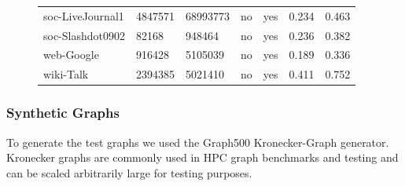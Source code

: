 \begin{figure}
{\begin{tabular}{ *7l }
soc-LiveJournal1 & 4847571 & 68993773 & no & yes &0.234& 0.463\\
soc-Slashdot0902 & 82168 & 948464 & no & yes &0.236&0.382\\
web-Google & 916428 & 5105039 & no & yes &0.189&0.336\\
wiki-Talk & 2394385 & 5021410 & no & yes &0.411&0.752\\
 \hline
\end{tabular}\par
}
\end{figure}





\subsubsection{Synthetic Graphs}
To generate the test graphs we used the Graph500 Kronecker-Graph generator.
Kronecker graphs are commonly used in HPC graph benchmarks and testing and can be scaled arbitrarily large for testing purposes. 


